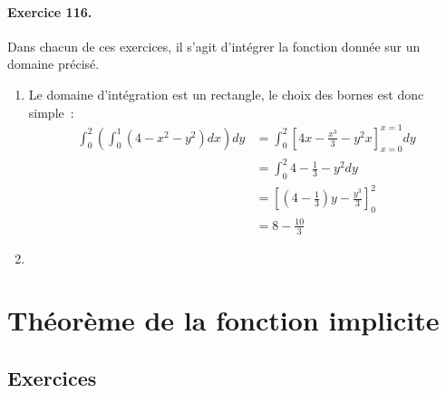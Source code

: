 \paragraph{Exercice 116.}
Dans chacun de ces exercices, il s'agit d'intégrer la fonction donnée
sur un domaine précisé.

\begin{enumerate}
\item Le domaine d'intégration est un rectangle, le choix des bornes
est donc simple~:
\begin{equation*}\begin{split}
\int_0^2 \left(\int_0^1 (4 - x^2 - y^2) d x\right) d y%
& = \int_0^2 \left[ 4x - \frac{x^3}3 - y^2x \right]_{x=0}^{x=1}
d y\\%
& = \int_0^2 4 - \frac13 - y^2 d y\\
& =\left[\left(4 - \frac13 \right)y - \frac{y^3}3 \right]_0^2\\
& = 8 - \frac{10}3
\end{split}\end{equation*}
\item
\end{enumerate}

\section{Théorème de la fonction implicite}




\subsection{Exercices}

